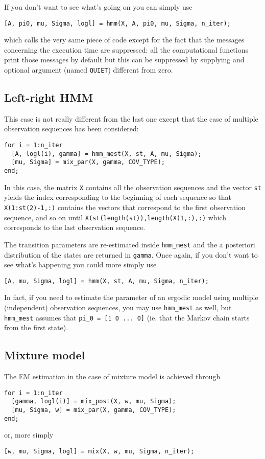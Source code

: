 \documentclass[a4paper,11pt]{article}
\begin{document}
If you don't want to see what's going on you can simply use
\begin{verbatim}
[A, pi0, mu, Sigma, logl] = hmm(X, A, pi0, mu, Sigma, n_iter);
\end{verbatim}
which calls the very same piece of code except for the fact that the messages concerning the execution time are suppressed: all the computational functions print those messages by default but this can be suppressed by supplying and optional argument (named \verb+QUIET+) different from zero.

\subsection{Left-right HMM}
This case is not really different from the last one except that the case of multiple observation sequences has been considered:
\begin{verbatim}
for i = 1:n_iter
  [A, logl(i), gamma] = hmm_mest(X, st, A, mu, Sigma);
  [mu, Sigma] = mix_par(X, gamma, COV_TYPE);
end;
\end{verbatim}
In this case, the matrix \verb+X+ contains all the observation sequences and the vector \verb+st+ yields the index corresponding to the beginning of each sequence so that \verb+X(1:st(2)-1,:)+ contains the vectors that correspond to the first observation sequence, and so on until \verb+X(st(length(st)),length(X(1,:),:)+ which corresponds to the last observation sequence.

The transition parameters are re-estimated inside \verb+hmm_mest+ and the a posteriori distribution of the states are returned in \verb+gamma+. Once again, if you don't want to see what's happening you could more simply use
\begin{verbatim}
[A, mu, Sigma, logl] = hmm(X, st, A, mu, Sigma, n_iter);
\end{verbatim}

In fact, if you need to estimate the parameter of an ergodic model using multiple (independent) observation sequences, you may use \verb+hmm_mest+ as well, but \verb+hmm_mest+ assumes that \verb+pi_0 = [1 0 ... 0]+ (ie. that the Markov chain starts from the first state).

\subsection{Mixture model}
The EM estimation in the case of mixture model is achieved through
\begin{verbatim}
for i = 1:n_iter
  [gamma, logl(i)] = mix_post(X, w, mu, Sigma);
  [mu, Sigma, w] = mix_par(X, gamma, COV_TYPE);
end;
\end{verbatim}
or, more simply
\begin{verbatim}
[w, mu, Sigma, logl] = mix(X, w, mu, Sigma, n_iter);
\end{verbatim}
\end{document}
